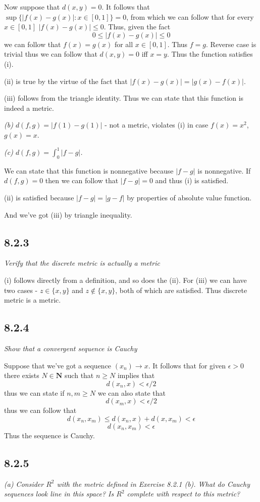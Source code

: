 \documentclass[11pt,oneside,titlepage]{book}
\begin{document}
Now suppose that $d(x, y) = 0$. It follows that $\sup\{|f(x) - g(x)|: x \in [0, 1]\}  = 0$,
from which we can follow that for every $x \in [0, 1]$ $|f(x) - g(x)| \leq 0$. Thus,
given the fact
$$0 \leq |f(x) - g(x)| \leq 0$$
we can follow that $f(x) = g(x)$ for all $x \in [0, 1]$. Thus $f = g$. Reverse case is trivial
thus we can follow that $d(x, y) = 0$ iff $x = y$. Thus the function satisfies (i).

(ii) is true by the virtue of the fact that $|f(x) - g(x)| = |g(x) - f(x)|$.

(iii) follows from the triangle identity. Thus we can state that this function is indeed a metric.

\textit{(b) $d(f, g) = |f(1) - g(1)|$} - not a metric, violates (i) in case $f(x) = x^2$,
$g(x) = x$.

\textit{(c) $d(f, g) = \int_0^1 |f - g|$.}

We can state that this function is nonnegative because $|f - g|$ is nonnegative. If
$d(f, g) = 0$ then we can follow that $|f - g| = 0$ and thus (i) is satisfied.

(ii) is satisfied because $|f - g| = |g - f|$ by properties of absolute value function.

And we've got (iii) by triangle inequality.

\subsection*{8.2.3}
\textit{Verify that the discrete metric is actually a metric}

(i) follows directly from a definition, and so does the (ii). For (iii) we can
have two cases - $z \in \{x, y\}$ and $z \notin \{x, y\}$, both of which are satisfied. Thus
discrete metric is a metric.

\subsection*{8.2.4}
\textit{Show that a convergent sequence is Cauchy}

Suppose that we've got a sequence $(x_n) \to x$. It follows that
for given $\epsilon > 0$ there exists $N \in \textbf{N}$ such that $n \geq N$ implies that 
$$d(x_n, x) < \epsilon / 2$$
thus we can state if $n, m \geq N$ we can also state that
$$d(x_m, x) < \epsilon / 2$$
thus we can follow that
$$d(x_n, x_m) \leq d(x_n, x) + d(x, x_m) < \epsilon$$
$$d(x_n, x_m)  < \epsilon$$
Thus the sequence is Cauchy.

\subsection*{8.2.5}
\textit{(a) Consider $R^2$ with the metric defined in Exercise 8.2.1 (b). What do Cauchy
sequences look line in this space? Is $R^2$ complete with respect to this metric?}
\end{document}
